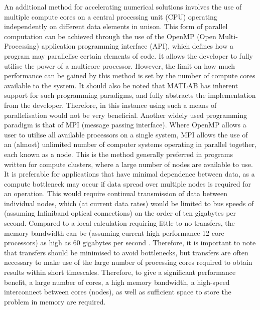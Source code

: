 An additional method for accelerating numerical solutions involves the use of multiple compute cores on a central processing unit (CPU) operating independently on different data elements in unison. This form of parallel computation can be achieved through the use of the OpenMP (Open Multi-Processing)  application programming interface (API), which defines how a program may parallelise certain elements of code. It allows the developer to fully utilise the power of a multicore processor. However, the limit on how much performance can be gained by this method is set by the number of compute cores available to the system. It should also be noted that MATLAB has inherent support for such programming paradigms, and fully abstracts the implementation from the developer. Therefore, in this instance using such a means of parallelisation would not be very beneficial. Another widely used programming paradigm is that of MPI (message passing interface). Where OpenMP allows a user to utilise all available processors on a single system, MPI allows the use of an (almost) unlimited number of computer systems operating in parallel together, each known as a node. This is the method generally preferred in programs written for compute clusters, where a large number of nodes are available to use. It is preferable for applications that have minimal dependence between data, as a compute bottleneck may occur if data spread over multiple nodes is required for an operation. This would require continual transmission of data  between individual nodes, which (at current data rates) would be limited to bus speeds of (assuming Infiniband optical connections) on the order of ten gigabytes per second. Compared to a local calculation requiring little to no transfers, the memory bandwidth can be (assuming current high performance 12 core processors) as high as 60 gigabytes per second \cite{DAT:Intel_xeon}. Therefore, it is important to note that transfers should be minimised to avoid bottlenecks, but transfers are often necessary to make use of the large number of processing cores required to obtain results within short timescales. Therefore, to give a significant performance benefit, a large number of cores, a high memory bandwidth, a high-speed interconnect between cores (nodes), as well as sufficient space to store the problem in memory are required.

